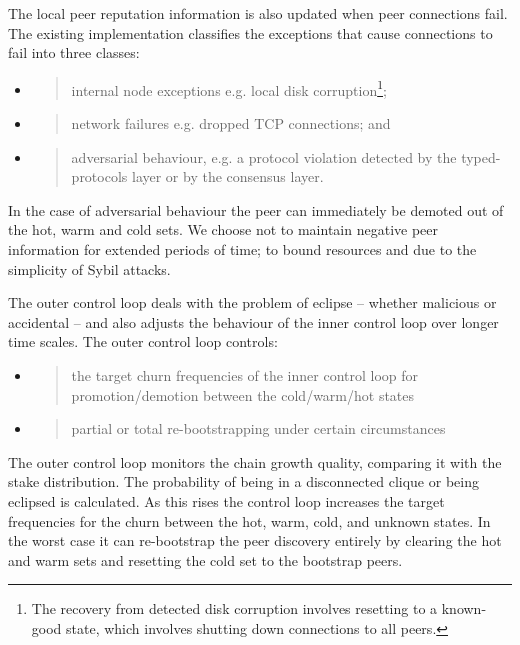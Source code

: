 \documentclass[]{article}
\begin{document}
The local peer reputation information is also updated when peer
connections fail. The existing implementation classifies the exceptions
that cause connections to fail into three classes:

\begin{itemize}
\item
  \begin{quote}
  internal node exceptions e.g. local disk corruption\footnote{The
    recovery from detected disk corruption involves resetting to a
    known-good state, which involves shutting down connections to all
    peers.};
  \end{quote}
\item
  \begin{quote}
  network failures e.g. dropped TCP connections; and
  \end{quote}
\item
  \begin{quote}
  adversarial behaviour, e.g. a protocol violation detected by the
  typed-protocols layer or by the consensus layer.
  \end{quote}
\end{itemize}

In the case of adversarial behaviour the peer can immediately be demoted
out of the hot, warm and cold sets. We choose not to maintain negative
peer information for extended periods of time; to bound resources and
due to the simplicity of Sybil attacks.

The outer control loop deals with the problem of eclipse -- whether
malicious or accidental -- and also adjusts the behaviour of the inner
control loop over longer time scales. The outer control loop controls:

\begin{itemize}
\item
  \begin{quote}
  the target churn frequencies of the inner control loop for
  promotion/demotion between the cold/warm/hot states
  \end{quote}
\item
  \begin{quote}
  partial or total re-bootstrapping under certain circumstances
  \end{quote}
\end{itemize}

The outer control loop monitors the chain growth quality, comparing it
with the stake distribution. The probability of being in a disconnected
clique or being eclipsed is calculated. As this rises the control loop
increases the target frequencies for the churn between the hot, warm,
cold, and unknown states. In the worst case it can re-bootstrap the peer
discovery entirely by clearing the hot and warm sets and resetting the
cold set to the bootstrap peers.
\end{document}
